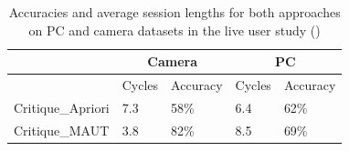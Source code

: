 \begin{table}[h]
\renewcommand{\arraystretch}{1.4}
\centering
\begin{tabular}{|p{5cm}|l|l|l|l|}
\hline
                  & \multicolumn{2}{c|}{Camera} & \multicolumn{2}{c|}{PC} \\ \hline
                  & Cycles      & Accuracy      & Cycles    & Accuracy    \\ \hline
Critique\_Apriori & 7.3         & 58\%          & 6.4       & 62\%        \\ \hline
Critique\_MAUT    & 3.8         & 82\%          & 8.5       & 69\%        \\ \hline
\end{tabular}
 \caption{Accuracies and average session lengths for both approaches on PC and camera datasets in the live user study (\cite{liveUserStudy})}
 \label{tab:liveUserStudies}
\end{table}



